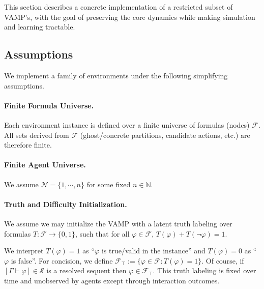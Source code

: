 \documentclass[letterpaper]{article} %
\renewcommand{\phi}{\varphi}
\newcommand{\proves}{\vdash}
\begin{document}
This section describes a concrete implementation of a restricted subset of VAMP's, with the goal of preserving the core dynamics while making simulation and learning tractable.

\subsection{Assumptions}

We implement a family of environments under the following simplifying assumptions.

\paragraph{Finite Formula Universe.}
Each environment instance is defined over a finite universe of formulas (nodes) $\mathcal{F}$.
All sets derived from $\mathcal{F}$ (ghost/concrete partitions, candidate actions, etc.)
are therefore finite.

\paragraph{Finite Agent Universe.}
We assume $\mathcal{N} = \{1,\cdots,n\}$ for some fixed $n \in \mathbb N$.


\paragraph{Truth and Difficulty Initialization.}

We assume we may initialize the VAMP with a latent truth labeling over formulas $T:\mathcal F\to\{0,1\}$, such that for all $\phi\in\mathcal F$, $T(\phi)+T(\neg\phi)=1$.

We interpret $T(\phi)=1$ as ``$\phi$ is true/valid in the instance'' and $T(\phi)=0$ as ``$\phi$ is false''. For concision, we define $\mathcal{F}_\top := \{\phi \in \mathcal F : T(\phi)=1\}$. Of course, if $[\Gamma \proves \phi]\in\mathcal S$ is a resolved sequent then $\phi \in \mathcal{F}_\top$.
This truth labeling is fixed over time and unobserved by agents except through interaction outcomes.
\end{document}
